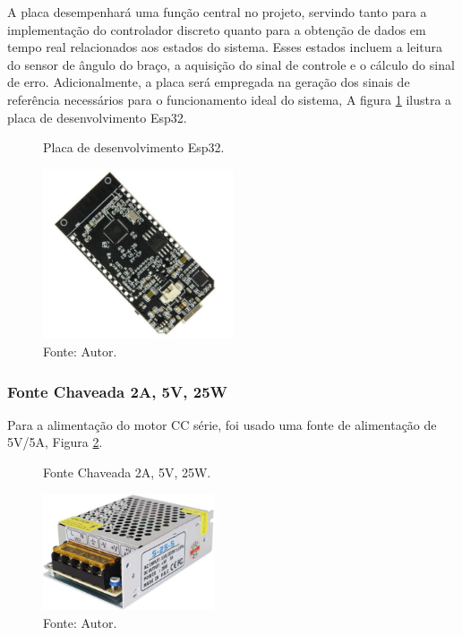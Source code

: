A placa desempenhará uma função central no projeto, servindo tanto para a implementação do controlador discreto quanto para a obtenção de dados em tempo real relacionados aos estados do sistema. Esses estados incluem a leitura do sensor de ângulo do braço, a aquisição do sinal de controle e o cálculo do sinal de erro. Adicionalmente, a placa será empregada na geração dos sinais de referência necessários para o funcionamento ideal do sistema, A figura \ref{fig3:image_05} ilustra a placa de desenvolvimento Esp32.

\begin{figure}[!h]
	\centering
	\caption{Placa de desenvolvimento Esp32.}
	\includegraphics[width=0.5\textwidth]{Capitulos/3_simulacao_e_prototipo/3_figuras/f1_esp32.pdf}
	\caption*{Fonte: Autor.}
	\label{fig3:image_05}
\end{figure}


\subsubsection{Fonte Chaveada 2A, 5V, 25W}

Para a alimentação do motor CC série, foi usado uma fonte de alimentação de 5V/5A, Figura \ref{fig3:image_06}.

\begin{figure}[!h]
	\centering
	\caption{Fonte Chaveada 2A, 5V, 25W.}
	\includegraphics[width=0.45\textwidth]{Capitulos/3_simulacao_e_prototipo/3_figuras/f1_fonte.pdf}
	\caption*{Fonte: Autor.}
	\label{fig3:image_06}
\end{figure}



